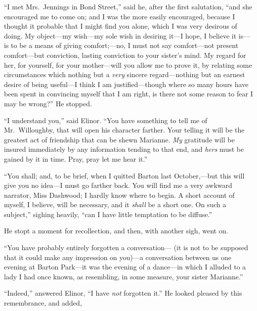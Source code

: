 \documentclass{article}
\begin{document}
``I met Mrs.\ Jennings in Bond Street,'' said he,
after the first salutation, ``and she encouraged me
to come on; and I was the more easily encouraged,
because I thought it probable that I might find you alone,
which I was very desirous of doing.  My object---my
wish---my sole wish in desiring it---I hope, I believe
it is---is to be a means of giving comfort;---no, I must
not say comfort---not present comfort---but conviction,
lasting conviction to your sister's mind.  My regard for her,
for yourself, for your mother---will you allow me to prove it,
by relating some circumstances which nothing but a \emph{very}
sincere regard---nothing but an earnest desire of being
useful---I think I am justified---though where so many hours
have been spent in convincing myself that I am right,
is there not some reason to fear I may be wrong?''
He stopped.

``I understand you,'' said Elinor.  ``You have something
to tell me of Mr.\ Willoughby, that will open his character
farther.  Your telling it will be the greatest act of friendship
that can be shewn Marianne.  \emph{My} gratitude will be insured
immediately by any information tending to that end, and \emph{hers}
must be gained by it in time.  Pray, pray let me hear it.''

``You shall; and, to be brief, when I quitted Barton
last October,---but this will give you no idea---I must go
farther back.  You will find me a very awkward narrator,
Miss Dashwood; I hardly know where to begin.  A short
account of myself, I believe, will be necessary, and it
\emph{shall} be a short one.  On such a subject,'' sighing heavily,
``can I have little temptation to be diffuse.''

He stopt a moment for recollection, and then,
with another sigh, went on.

``You have probably entirely forgotten a conversation---%
(it is not to be supposed that it could make any impression
on you)---a conversation between us one evening at Barton
Park---it was the evening of a dance---in which I alluded
to a lady I had once known, as resembling, in some measure,
your sister Marianne.''

``Indeed,'' answered Elinor, ``I have \emph{not} forgotten it.''
He looked pleased by this remembrance, and added,
\end{document}

